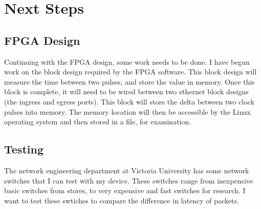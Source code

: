 \chapter{Next Steps}\label{C:nextSteps}

\section{FPGA Design}

Continuing with the FPGA design, some work needs to be done. 
I have begun work on the block design required by the FPGA software. 
This block design will measure the time between two pulses, and store the value in memory.
Once this block is complete, it will need to be wired between two ethernet block designs (the ingress and egress ports).
This block will store the delta between two clock pulses into memory.
The memory location will then be accessible by the Linux operating system and then stored in a file, for examination.

\section{Testing}

The network engineering department at Victoria University has some network switches that I can test with my device.
These switches range from inexpensive basic switches from stores, to very expensive and fast switches for research.
I want to test these swtiches to compare the difference in latency of packets.
